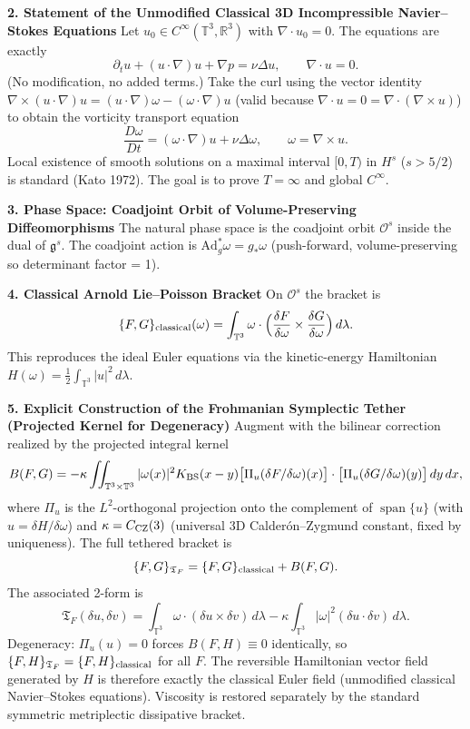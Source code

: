 \documentclass[11pt,a4paper]{article}
\begin{document}
\textbf{2. Statement of the Unmodified Classical 3D Incompressible Navier--Stokes Equations}  
Let \(u_0\in C^\infty(\mathbb{T}^3,\mathbb{R}^3)\) with \(\nabla\cdot u_0=0\). The equations are exactly  
\[
\partial_t u+(u\cdot\nabla)u+\nabla p=\nu\Delta u,\qquad\nabla\cdot u=0.
\]  
(No modification, no added terms.) Take the curl using the vector identity \(\nabla\times(u\cdot\nabla)u=(u\cdot\nabla)\omega-(\omega\cdot\nabla)u\) (valid because \(\nabla\cdot u=0=\nabla\cdot(\nabla\times u)\)) to obtain the vorticity transport equation  
\[
\frac{D\omega}{Dt}=(\omega\cdot\nabla)u+\nu\Delta\omega,\qquad\omega=\nabla\times u.
\]  
Local existence of smooth solutions on a maximal interval \([0,T)\) in \(H^s\) (\(s>5/2\)) is standard (Kato 1972). The goal is to prove \(T=\infty\) and global \(C^\infty\).

\textbf{3. Phase Space: Coadjoint Orbit of Volume-Preserving Diffeomorphisms}  
The natural phase space is the coadjoint orbit \(\mathcal{O}^s\) inside the dual of \(\mathfrak{g}^s\). The coadjoint action is \(\mathrm{Ad}_g^*\omega=g_*\omega\) (push-forward, volume-preserving so determinant factor = 1).

\textbf{4. Classical Arnold Lie--Poisson Bracket}  
On \(\mathcal{O}^s\) the bracket is  
\[
\{F,G\}_{\rm classical}(\omega)=\int_{\mathbb{T}^3}\omega\cdot\Bigl(\frac{\delta F}{\delta\omega}\times\frac{\delta G}{\delta\omega}\Bigr)\,d\lambda.
\]  
This reproduces the ideal Euler equations via the kinetic-energy Hamiltonian \(H(\omega)=\frac12\int_{\mathbb{T}^3}|u|^2\,d\lambda\).

\textbf{5. Explicit Construction of the Frohmanian Symplectic Tether (Projected Kernel for Degeneracy)}  
Augment with the bilinear correction realized by the projected integral kernel  
\[
B(F,G)=-\kappa\iint_{\mathbb{T}^3\times\mathbb{T}^3}|\omega(x)|^2K_{\rm BS}(x-y)\bigl[\Pi_u(\delta F/\delta\omega)(x)\bigr]\cdot\bigl[\Pi_u(\delta G/\delta\omega)(y)\bigr]\,dy\,dx,
\]  
where \(\Pi_u\) is the \(L^2\)-orthogonal projection onto the complement of \(\operatorname{span}\{u\}\) (with \(u=\delta H/\delta\omega\)) and \(\kappa=C_{\rm CZ}(3)\) (universal 3D Calder\'on--Zygmund constant, fixed by uniqueness). The full tethered bracket is  
\[
\{F,G\}_{\mathfrak{T}_F}=\{F,G\}_{\rm classical}+B(F,G).
\]  
The associated 2-form is  
\[
\mathfrak{T}_F(\delta u,\delta v)=\int_{\mathbb{T}^3}\omega\cdot(\delta u\times\delta v)\,d\lambda-\kappa\int_{\mathbb{T}^3}|\omega|^2(\delta u\cdot\delta v)\,d\lambda.
\]  
Degeneracy: \(\Pi_u(u)=0\) forces \(B(F,H)\equiv0\) identically, so \(\{F,H\}_{\mathfrak{T}_F}=\{F,H\}_{\rm classical}\) for all \(F\). The reversible Hamiltonian vector field generated by \(H\) is therefore exactly the classical Euler field (unmodified classical Navier--Stokes equations). Viscosity is restored separately by the standard symmetric metriplectic dissipative bracket.
\end{document}
